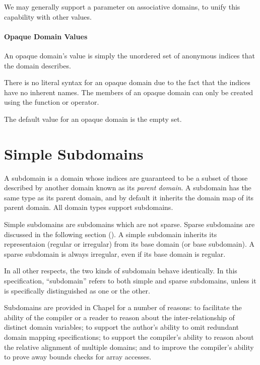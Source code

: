 \begin{future}
We may generally support a  parameter on associative
domains, to unify this capability with other values.
\end{future}

\paragraph{Opaque Domain Values}

An opaque domain's value is simply the unordered set of anonymous
indices that the domain describes.


There is no literal syntax for an opaque domain due to the fact that
the indices have no inherent names.  The members of an opaque domain can only be
created using the  function or \chpl{+} operator.


The default value for an opaque domain is the empty set.


\section{Simple Subdomains}
\label{Simple_Subdomains}

A subdomain is a domain whose indices are guaranteed to be a subset of
those described by another domain known as its \emph{parent domain}.
A subdomain has the same type as its parent domain, and by default
it inherits the domain map of its parent domain.  All domain types
support subdomains.

Simple subdomains are subdomains which are not sparse.  Sparse subdomains are
discussed in the following section ().  A simple
subdomain inherits its representaion (regular or irregular) from its base domain (or base
subdomain).  A sparse subdomain is always irregular, even if its base domain is
regular.  

In all other respects, the two kinds of subdomain behave identically.  In this
specification, ``subdomain'' refers to both simple and sparse subdomains, unless
it is specifically distinguished as one or the other.

\begin{rationale}
Subdomains are provided in Chapel for a number of reasons: to
facilitate the ability of the compiler or a reader to reason about the
inter-relationship of distinct domain variables; to support the
author's ability to omit redundant domain mapping specifications; to
support the compiler's ability to reason about the relative alignment
of multiple domains; and to improve the compiler's ability to prove
away bounds checks for array accesses.
\end{rationale}

